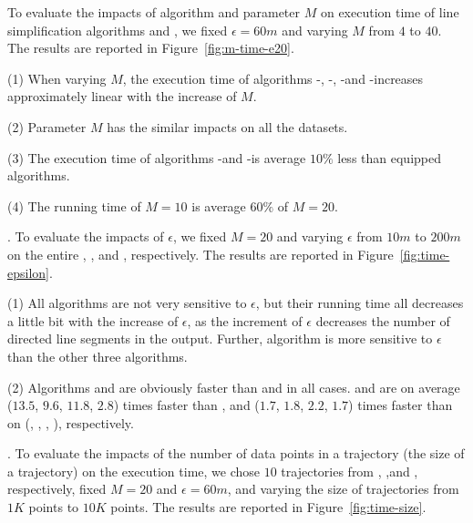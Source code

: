 To evaluate the impacts of algorithm \rpia and parameter $M$ on execution time of line simplification algorithms \cist and \cista, we fixed $\epsilon =60m$ and varying $M$ from $4$ to $40$.
%
The results are reported in Figure~\ref{fig:m-time-e20}. %

\ni(1) When varying $M$, the execution time of algorithms \cist-\rpia, \cist-\cpia, \cista-\rpia and \cista-\cpia increases approximately linear with the increase of $M$.

\ni(2) Parameter $M$ has the similar impacts on all the datasets.

\ni(3) The execution time of algorithms \cist-\rpia and \cista-\rpia is average \textcolor[rgb]{1.00,0.00,0.00}{$10\%$} less than \cpia equipped algorithms.

\ni(4) The running time of $M=10$ is average \textcolor[rgb]{1.00,0.00,0.00}{$60\%$} of $M=20$.


.
To evaluate the impacts of $\epsilon$, we fixed $M=20$ and varying $\epsilon$  from $10m$ to $200m$ on the entire \truck, \sercar, \geolife and \pricar, respectively.
The results are reported in Figure~\ref{fig:time-epsilon}.

\ni(1) All algorithms are not very sensitive to $\epsilon$, but their running time all decreases a little bit with the increase of $\epsilon$, as the increment of $\epsilon$ decreases the number of directed line segments in the output.
Further, algorithm \dpa is more sensitive to $\epsilon$ than the other three algorithms.

\ni(2) Algorithms \cist and \cista are obviously faster than \dpa and \squishe in all cases.
\cist and \cista are on average ($13.5$, $9.6$, $11.8$, {$2.8$}) times faster than \dpa, and {($1.7$, $1.8$, $2.2$, {$1.7$}) times faster} than \squishe on (\truck, \sercar, {\geolife}, \pricar), respectively.


.
To evaluate the impacts of the number of data points in a trajectory (\ie the size of a trajectory) on the execution time,
we chose {$10$} trajectories from \truck, \sercar,\geolife and \pricar, respectively,
fixed $M=20$ and $\epsilon = 60m$, and varying the size  of trajectories from $1K$ points to $10K$ points.
%
The results are reported in Figure~\ref{fig:time-size}.

